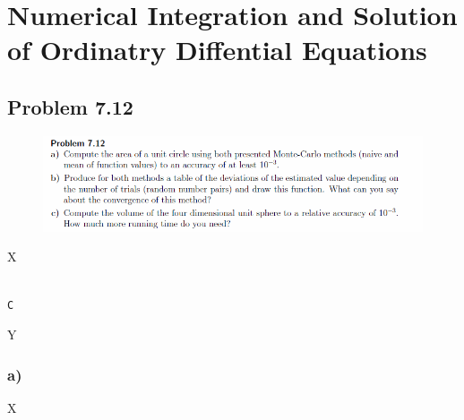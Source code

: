 \section{Numerical Integration and Solution of Ordinatry Diffential Equations}


\subsection{Problem 7.12}


\begin{figure}[!ht]
\includegraphics[width=1\textwidth]{chapters/images/desc-7-12}
\end{figure}


X

\begin{lstlisting}[caption=todo]

C

\end{lstlisting}

Y


\subsubsection{a)}

X


